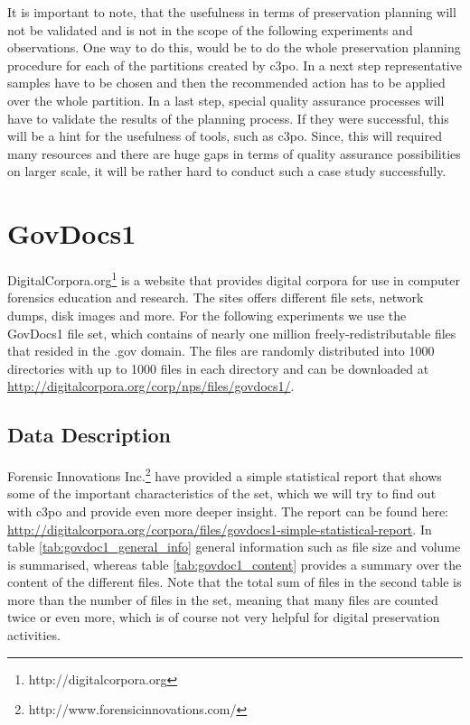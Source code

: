It is important to note, that the usefulness in terms of preservation planning will not be validated and is not in the scope of the following experiments and observations.
One way to do this, would be to do the whole preservation planning procedure for each of the partitions created by c3po. In a next step representative samples have to be chosen and then the recommended action has to be applied over the whole partition.
In a last step, special quality assurance processes will have to validate the results of the planning process.
If they were successful, this will be a hint for the usefulness of tools, such as c3po.
Since, this will required many resources and there are huge gaps in terms of quality assurance possibilities on larger scale, it will be rather hard to conduct such a case study successfully.

\section{GovDocs1}
DigitalCorpora.org\footnote{http://digitalcorpora.org} is a website that provides digital corpora for use in computer forensics education and research.
The sites offers different file sets, network dumps, disk images and more.
For the following experiments we use the GovDocs1 file set, which contains of nearly one million freely-redistributable files that resided in the .gov domain.
The files are randomly distributed into 1000 directories with up to 1000 files in each directory and can be downloaded at \url{http://digitalcorpora.org/corp/nps/files/govdocs1/}.

\subsection{Data Description}
Forensic Innovations Inc.\footnote{http://www.forensicinnovations.com/} have provided a simple statistical report that shows some of the important characteristics of the set, which we will try to find out with c3po and provide even more deeper insight.
The report can be found here: \url{http://digitalcorpora.org/corpora/files/govdocs1-simple-statistical-report}.
In table \ref{tab:govdoc1_general_info} general information such as file size and volume is summarised, whereas table \ref{tab:govdoc1_content} provides a summary over the content of the different files.
Note that the total sum of files in the second table is more than the number of files in the set, meaning that many files are counted twice or even more, which is of course not very helpful for digital preservation activities.

